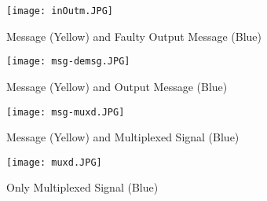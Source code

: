 \begin{figure}[H]
    \centering
    \begin{minipage}{0.45\linewidth}
        \centering
        \texttt{[image: inOutm.JPG]}
        \caption{Message (Yellow) and Faulty Output Message (Blue)}
        \label{fig:fm1}
    \end{minipage}
    \hfill
    \begin{minipage}{0.45\linewidth}
        \centering
        \texttt{[image: msg-demsg.JPG]}
        \caption{Message (Yellow) and Output Message (Blue)}
        \label{fig:fm2}
    \end{minipage}
    \vspace{1em}
    \begin{minipage}{0.45\linewidth}
        \centering
        \texttt{[image: msg-muxd.JPG]}
        \caption{Message (Yellow) and Multiplexed Signal (Blue)}
        \label{fig:fm3}
    \end{minipage}
    \hfill
    \begin{minipage}{0.45\linewidth}
        \centering
        \texttt{[image: muxd.JPG]}
        \caption{Only Multiplexed Signal (Blue)}
        \label{fig:fm4}
    \end{minipage}
\end{figure}

